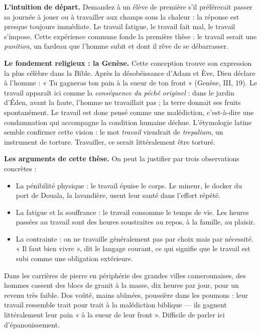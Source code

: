 \documentclass[11pt]{article}
\newcommand{\cle}[1]{{\popxbold\color{popdark}#1}}
\begin{document}
\textbf{L'intuition de départ.} Demandez à un élève de première s'il préférerait passer sa journée à jouer ou à travailler aux champs sous la chaleur : la réponse est presque toujours immédiate. Le travail fatigue, le travail fait mal, le travail s'impose. Cette expérience commune fonde la première thèse : le travail serait une \emph{punition}, un fardeau que l'homme subit et dont il rêve de se débarrasser.

\textbf{Le fondement religieux : la Genèse.} Cette conception trouve son expression la plus célèbre dans la \cle{Bible}. Après la désobéissance d'Adam et Ève, Dieu déclare à l'homme : « Tu gagneras ton pain à la sueur de ton front » (Genèse, III, 19). Le travail apparaît ici comme la \emph{conséquence du péché originel} : dans le jardin d'Éden, avant la faute, l'homme ne travaillait pas ; la terre donnait ses fruits spontanément. Le travail est donc pensé comme une \cle{malédiction}, c'est-à-dire une condamnation qui accompagne la condition humaine déchue. L'étymologie latine semble confirmer cette vision : le mot \emph{travail} viendrait de \emph{trepalium}, un instrument de torture. Travailler, ce serait littéralement être torturé.

\textbf{Les arguments de cette thèse.} On peut la justifier par trois observations concrètes :
\begin{itemize}
\item La \cle{pénibilité} physique : le travail épuise le corps. Le mineur, le docker du port de Douala, la lavandière, usent leur santé dans l'effort répété.
\item La \cle{fatigue} et la souffrance : le travail consomme le temps de vie. Les heures passées au travail sont des heures soustraites au repos, à la famille, au plaisir.
\item La \cle{contrainte} : on ne travaille généralement pas par choix mais par nécessité. « Il faut bien vivre », dit le langage courant, ce qui signifie que le travail est subi comme une obligation extérieure.
\end{itemize}

\begin{exemplebox}
Dans les carrières de pierre en périphérie des grandes villes camerounaises, des hommes cassent des blocs de granit à la masse, dix heures par jour, pour un revenu très faible. Dos voûté, mains abîmées, poussière dans les poumons : leur travail ressemble trait pour trait à la malédiction biblique — ils gagnent littéralement leur pain « à la sueur de leur front ». Difficile de parler ici d'épanouissement.
\end{exemplebox}
\end{document}
